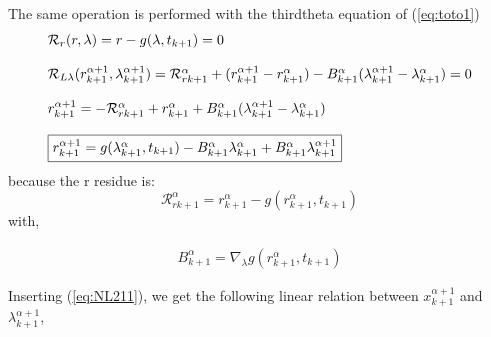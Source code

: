 The same operation is performed with the thirdtheta equation of (\ref{eq:toto1})
\begin{equation}
   \label{eq:NL29}
   \begin{array}{l}
      \mathcal R_r(r,\lambda)=r-g(\lambda,t_{k+1}) =0\\ \\
      \mathcal R_{L\lambda}(r^{\alpha+1}_{k+1},\lambda^{\alpha+1}_{k+1}) = \mathcal
      R_{rk+1}^{\alpha} + (r^{\alpha+1}_{k+1} - r^{\alpha}_{k+1}) -
      B^{\alpha}_{k+1}(\lambda^{\alpha+1}_{k+1} -
      \lambda^{\alpha}_{k+1})=0\\ \\

      r^{\alpha+1}_{k+1} = - \mathcal R_{rk+1}^{\alpha} + r^{\alpha}_{k+1} + B^{\alpha}_{k+1}(\lambda^{\alpha+1}_{k+1} -
      \lambda^{\alpha}_{k+1})\\ \\
      \fbox{$r^{\alpha+1}_{k+1} = g(\lambda ^{\alpha}_{k+1},t_{k+1}) -B^{\alpha}_{k+1}
      \lambda^{\alpha}_{k+1} + B^{\alpha}_{k+1} \lambda^{\alpha+1}_{k+1}$}       
 \end{array}
\end{equation}
because the r residue is:
\begin{equation}
\mathcal
      R_{rk+1}^{\alpha} = r^{\alpha}_{k+1} - g(r^{\alpha}_{k+1},t_{k+1})
  \end{equation}
with,

\begin{equation}
     \begin{array}{l}
  B^{\alpha}_{k+1} = \nabla_{\lambda}g(r^{\alpha}_{k+1},t_{k+1})
 \end{array}
\end{equation}

Inserting (\ref{eq:NL211}), we get the following linear relation between $x^{\alpha+1}_{k+1}$ and
$\lambda^{\alpha+1}_{k+1}$, 

